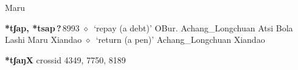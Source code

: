 \begin{list}{}{\leftmargin=1.5em \itemindent=-1.5em}
         Maru 
  \item {\footnotesize \textbf{*tʃap, *tsap\,?\,}}{\tiny 8993}
\hspace{1ex}
         $\diamond$~`repay (a debt)'
         OBur. 
\hspace{1ex}
         Achang\_Longchuan 
\hspace{1ex}
         Atsi 
\hspace{1ex}
         Bola 
\hspace{1ex}
         Lashi 
\hspace{1ex}
         Maru 
\hspace{1ex}
         Xiandao 
\hspace{1ex}
         $\diamond$~`return (a pen)'
         Achang\_Longchuan 
\hspace{1ex}
         Xiandao 
  \end{list}
\item
\textbf{*tʃaŋX}
  {\tiny crossid 4349, 7750, 8189}
